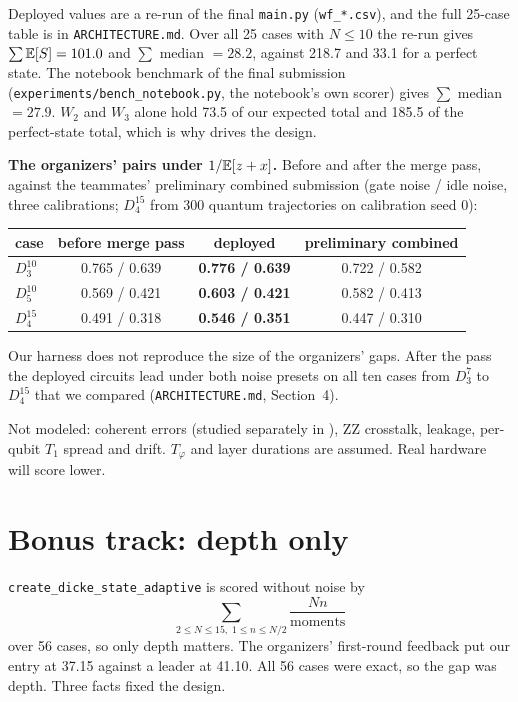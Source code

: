 \documentclass[11pt]{scrartcl}
\newcommand{\D}[2]{D^{#1}_{#2}}
\newcommand{\file}[1]{\texttt{\small #1}}
\begin{document}
Deployed values are a re-run of the final \file{main.py} (\file{wf\_*.csv}), and the full 25-case
table is in \file{ARCHITECTURE.md}. Over all 25 cases with $N\le10$ the re-run gives
$\sum\mathbb E[S]=101.0$ and $\sum$ median $=28.2$, against 218.7 and 33.1 for a perfect state. The
notebook benchmark of the final submission (\file{experiments/bench\_notebook.py}, the notebook's
own scorer) gives $\sum$ median $=27.9$. $W_2$ and $W_3$ alone hold 73.5 of our expected total and
185.5 of the perfect-state total, which is why  drives the design.

\textbf{The organizers' pairs under $1/\mathbb E[z+x]$.} Before and after the merge pass, against the
teammates' preliminary combined submission (gate noise / idle noise, three calibrations; $\D{15}4$
from 300 quantum trajectories on calibration seed 0):
\begin{center}\small
\begin{tabular}{lccc}
  \toprule
  case & before merge pass & deployed & preliminary combined\\
  \midrule
  $\D{10}3$ & 0.765 / 0.639 & \textbf{0.776 / 0.639} & 0.722 / 0.582\\
  $\D{10}5$ & 0.569 / 0.421 & \textbf{0.603 / 0.421} & 0.582 / 0.413\\
  $\D{15}4$ & 0.491 / 0.318 & \textbf{0.546 / 0.351} & 0.447 / 0.310\\
  \bottomrule
\end{tabular}
\end{center}
Our harness does not reproduce the size of the organizers' gaps. After the pass the deployed
circuits lead under both noise presets on all ten cases from $\D73$ to $\D{15}4$ that we compared
(\file{ARCHITECTURE.md}, Section~4).

\begin{remark}[Limits]
  Not modeled: coherent errors (studied separately in ), ZZ crosstalk, leakage,
  per-qubit $T_1$ spread and drift. $T_\varphi$ and layer durations are assumed.
  Real hardware will score lower.
\end{remark}

\section{Bonus track: depth only}\label{sec:bonus}

\file{create\_dicke\_state\_adaptive} is scored without noise by
\[
  \sum_{2\le N\le15,\;1\le n\le N/2}\frac{Nn}{\text{moments}}
\]
over 56 cases, so only depth matters. The organizers' first-round feedback put our entry at 37.15
against a leader at 41.10. All 56 cases were exact, so the gap was depth. Three facts fixed the
design.
\end{document}
